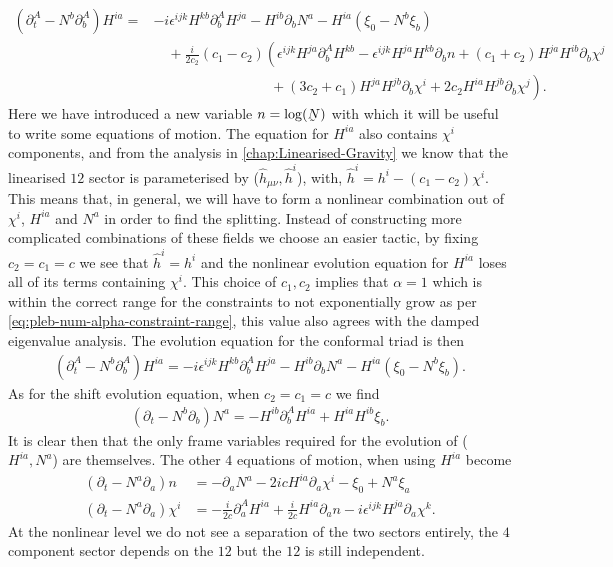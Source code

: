 \documentclass[10pt]{report}
\newcommand{\utilde}[1]{\underaccent{\tilde}{#1}}
\theoremstyle{definition}
\newcommand{\dlap}[0]{\utilde{N}}
\begin{document}
    \begin{align}
        (\partial^A_t - N^b \partial^A_b) H^{ia} = & -i \epsilon^{ijk} H^{kb} \partial_b^A H^{ja} - H^{ib} \partial_b N^a - H^{ia} (\xi_0 - N^b \xi_b) \nonumber\\  & \quad + \frac{i}{2c_2}(c_1-c_2) \left( \epsilon^{ijk} H^{ja} \partial^A_b H^{kb} - \epsilon^{ijk} H^{ja} H^{kb} \partial_b n  + (c_1+c_2) H^{ja} H^{ib} \partial_b \chi^j \right. \nonumber\\ & \left. \hspace{100pt} + (3c_2 + c_1) H^{ja} H^{jb} \partial_b \chi^i + 2c_2 H^{ia} H^{jb} \partial_b \chi^j  \right).
    \end{align}
    Here we have introduced a new variable $n = \log(\dlap)$ with which it will be useful to write some equations of motion. The equation for $H^{ia}$ also contains $\chi^i$ components, and from the analysis in \cref{chap:Linearised-Gravity} we know that the linearised $12$ sector is parameterised by ($\hat{h}_{\mu\nu}, \hat{h}^i$), with, $\hat{h}^i = h^i - (c_1 - c_2) \chi^i$. This means that, in general, we will have to form a nonlinear combination out of $\chi^i$, $H^{ia}$ and $N^a$ in order to find the splitting. Instead of constructing more complicated combinations of these fields we choose an easier tactic, by fixing $c_2 = c_1 = c$ we see that $\hat{h}^i = h^i$ and the nonlinear evolution equation for $H^{ia}$ loses all of its terms containing $\chi^i$. This choice of $c_1,c_2$ implies that $\alpha = 1$ which is within the correct range for the constraints to not exponentially grow as per \cref{eq:pleb-num-alpha-constraint-range}, this value also agrees with the damped eigenvalue analysis. The evolution equation for the conformal triad is then
    \begin{align}
        (\partial^A_t - N^b \partial^A_b) H^{ia} = -i \epsilon^{ijk} H^{kb} \partial^A_b H^{ja} - H^{ib} \partial_b N^a - H^{ia} (\xi_0 - N^b \xi_b).
    \end{align}
    As for the shift evolution equation, when $c_2 = c_1 = c$ we find 
    \begin{align}
        (\partial_t - N^b \partial_b) N^a = - H^{ib} \partial_b^A H^{ia} + H^{ia} H^{ib} \xi_b.
    \end{align}
    It is clear then that the only frame variables required for the evolution of ($H^{ia},N^a$) are themselves. The other $4$ equations of motion, when using $H^{ia}$ become 
    \begin{align}
        (\partial_t - N^a \partial_a) n &= - \partial_a N^a - 2ic H^{ia} \partial_a \chi^i - \xi_0 + N^a \xi_a \\
        (\partial_t - N^a \partial_a) \chi^i &= -\frac{i}{2 c} \partial^A_a H^{ia} + \frac{i}{2c} H^{ia} \partial_a n - i \epsilon^{ijk} H^{ja} \partial_a \chi^k.
    \end{align}
    At the nonlinear level we do not see a separation of the two sectors entirely, the $4$ component sector depends on the $12$ but the $12$ is still independent.
\end{document}
